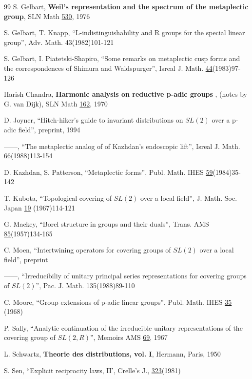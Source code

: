 \begin{thebibliography}{99}
  S. Gelbart, {\bf Weil's representation and the spectrum of the
metaplectic group}, SLN Math \underline{530}, 1976

  S. Gelbart, T. Knapp, ``L-indistinguishability and R groups for the
special linear group'', Adv. Math. 43(1982)101-121

  S. Gelbart, I. Piatetski-Shapiro, ``Some remarks on metaplectic cusp
forms and the correspondences of Shimura and Waldspurger'', Isreal J. Math. 
\underline{44}(1983)97-126

  Harish-Chandra, {\bf Harmonic analysis on reductive p-adic groups}%
, (notes by G. van Dijk), SLN Math \underline{162}, 1970

  D. Joyner, ``Hitch-hiker's guide to invariant distributions on $SL(2)$
over a p-adic field'', preprint, 1994

  ------, ``The metaplectic analog of of Kazhdan's endoscopic lift'',
Isreal J. Math. \underline{66}(1988)113-154

  D. Kazhdan, S. Patterson, ``Metaplectic forms'', Publ. Math. IHES 
\underline{59}(1984)35-142

  T. Kubota, ``Topological covering of $SL(2)$ over a local field'', J.
Math. Soc. Japan \underline{19} (1967)114-121

  G. Mackey, ``Borel structure in groups and their duals'', Trans. AMS 
\underline{85}(1957)134-165

  C. Moen, ``Intertwining operators for covering groups of $SL(2)$ over
a local field'', preprint

  ------, ``Irreducibiliy of unitary principal series representations
for covering groups of $SL(2)$'', Pac. J. Math. 135(1988)89-110

  C. Moore, ``Group extensions of p-adic linear groups'', Publ. Math. IHES 
\underline{35} (1968)

  P. Sally, ``Analytic continuation of the irreducible unitary
  representations of the covering group of $SL(2,R)$'',
  Memoirs AMS \underline{69}, 1967

  L. Schwartz, {\bf Theorie des distributions, vol. I}, Hermann, Paris, 1950

  S. Sen, ``Explicit reciprocity laws, II', Crelle's J.,
  \underline{323}(1981)


\end{thebibliography}
